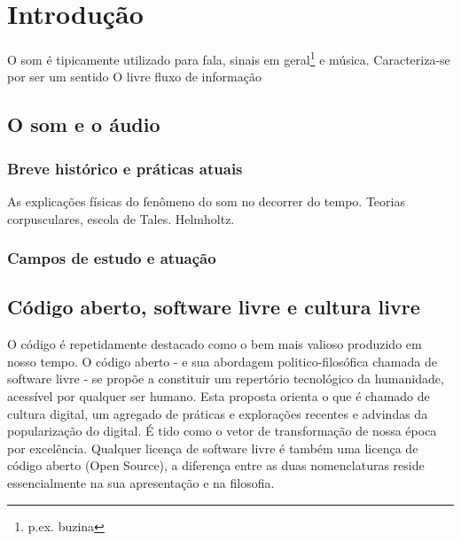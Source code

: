\chapter{Introdução} %
\label{cap:intro} %

O som é tipicamente utilizado para fala, sinais em geral\footnote{p.ex. buzina} e música.
Caracteriza-se por ser um sentido   O livre fluxo de informação


\section{O som e o áudio}

\subsection{Breve histórico e práticas atuais}

As explicações físicas do fenômeno do som no decorrer do tempo. Teorias
corpusculares, escola de Tales. Helmholtz.

\subsection{Campos de estudo e atuação}

\section{Código aberto, software livre e cultura livre} %

O código é repetidamente destacado como o bem mais valioso produzido em nosso tempo.
O código aberto - e sua abordagem politico-filosófica chamada de software livre -
se propõe a constituir um repertório tecnológico da humanidade, acessível por
qualquer ser humano. Esta proposta orienta o que é chamado de cultura digital,
um agregado de práticas e explorações recentes e advindas da popularização do digital.
É tido como o vetor de transformação de nossa época por excelência.
Qualquer licença de software livre é também uma licença de código aberto (Open Source), a diferença entre as duas nomenclaturas reside essencialmente na sua apresentação e na filosofia.




